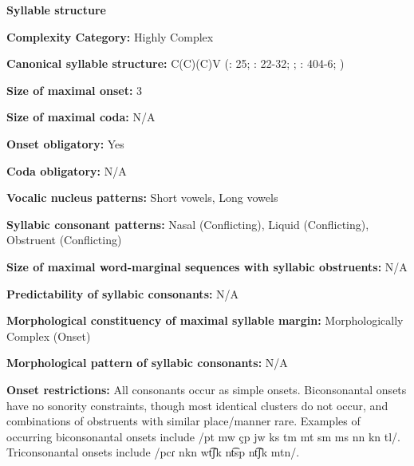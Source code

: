 \textbf{Syllable structure}



\textbf{Complexity Category:} Highly Complex



\textbf{Canonical syllable structure:} C(C)(C)V (\citealt{Hanson2010}: 25; \citealt{Matteson1965}: 22-32; \citealt{MattesonPike1958}; \citealt{Lin1997}: 404-6; \citealt{Lin1993})



\textbf{Size of maximal onset:} 3



\textbf{Size of maximal coda:} N/A



\textbf{Onset obligatory:} Yes



\textbf{Coda obligatory:} N/A



\textbf{Vocalic nucleus patterns:} Short vowels, Long vowels



\textbf{Syllabic consonant patterns:} Nasal (Conflicting), Liquid (Conflicting), Obstruent (Conflicting)



\textbf{Size of maximal word{}-marginal sequences with syllabic obstruents:} N/A



\textbf{Predictability of syllabic consonants:} N/A



\textbf{Morphological constituency of maximal syllable margin:} Morphologically Complex (Onset)



\textbf{Morphological pattern of syllabic consonants:} N/A



\textbf{Onset restrictions:} All consonants occur as simple onsets. Biconsonantal onsets have no sonority constraints, though most identical clusters do not occur, and combinations of obstruents with similar place/manner rare. Examples of occurring biconsonantal onsets include /pt mw çp jw ks tm mt sm ms nn kn tl/. Triconsonantal onsets include /pcɾ nkn wt͡ʃk nt͡sp nt͡ʃk mtn/.



